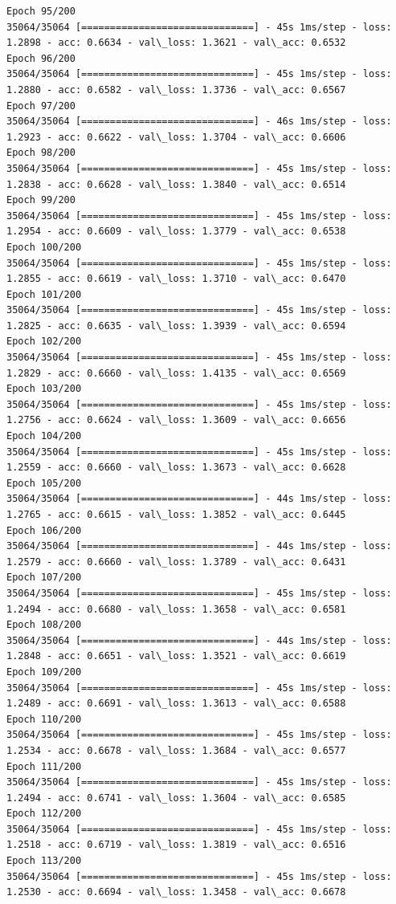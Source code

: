 \documentclass[11pt]{article}
\begin{document}
\begin{Verbatim}[commandchars=\\\{\}]
Epoch 95/200
35064/35064 [==============================] - 45s 1ms/step - loss: 1.2898 - acc: 0.6634 - val\_loss: 1.3621 - val\_acc: 0.6532
Epoch 96/200
35064/35064 [==============================] - 45s 1ms/step - loss: 1.2880 - acc: 0.6582 - val\_loss: 1.3736 - val\_acc: 0.6567
Epoch 97/200
35064/35064 [==============================] - 46s 1ms/step - loss: 1.2923 - acc: 0.6622 - val\_loss: 1.3704 - val\_acc: 0.6606
Epoch 98/200
35064/35064 [==============================] - 45s 1ms/step - loss: 1.2838 - acc: 0.6628 - val\_loss: 1.3840 - val\_acc: 0.6514
Epoch 99/200
35064/35064 [==============================] - 45s 1ms/step - loss: 1.2954 - acc: 0.6609 - val\_loss: 1.3779 - val\_acc: 0.6538
Epoch 100/200
35064/35064 [==============================] - 45s 1ms/step - loss: 1.2855 - acc: 0.6619 - val\_loss: 1.3710 - val\_acc: 0.6470
Epoch 101/200
35064/35064 [==============================] - 45s 1ms/step - loss: 1.2825 - acc: 0.6635 - val\_loss: 1.3939 - val\_acc: 0.6594
Epoch 102/200
35064/35064 [==============================] - 45s 1ms/step - loss: 1.2829 - acc: 0.6660 - val\_loss: 1.4135 - val\_acc: 0.6569
Epoch 103/200
35064/35064 [==============================] - 45s 1ms/step - loss: 1.2756 - acc: 0.6624 - val\_loss: 1.3609 - val\_acc: 0.6656
Epoch 104/200
35064/35064 [==============================] - 45s 1ms/step - loss: 1.2559 - acc: 0.6660 - val\_loss: 1.3673 - val\_acc: 0.6628
Epoch 105/200
35064/35064 [==============================] - 44s 1ms/step - loss: 1.2765 - acc: 0.6615 - val\_loss: 1.3852 - val\_acc: 0.6445
Epoch 106/200
35064/35064 [==============================] - 44s 1ms/step - loss: 1.2579 - acc: 0.6660 - val\_loss: 1.3789 - val\_acc: 0.6431
Epoch 107/200
35064/35064 [==============================] - 45s 1ms/step - loss: 1.2494 - acc: 0.6680 - val\_loss: 1.3658 - val\_acc: 0.6581
Epoch 108/200
35064/35064 [==============================] - 44s 1ms/step - loss: 1.2848 - acc: 0.6651 - val\_loss: 1.3521 - val\_acc: 0.6619
Epoch 109/200
35064/35064 [==============================] - 45s 1ms/step - loss: 1.2489 - acc: 0.6691 - val\_loss: 1.3613 - val\_acc: 0.6588
Epoch 110/200
35064/35064 [==============================] - 45s 1ms/step - loss: 1.2534 - acc: 0.6678 - val\_loss: 1.3684 - val\_acc: 0.6577
Epoch 111/200
35064/35064 [==============================] - 45s 1ms/step - loss: 1.2494 - acc: 0.6741 - val\_loss: 1.3604 - val\_acc: 0.6585
Epoch 112/200
35064/35064 [==============================] - 45s 1ms/step - loss: 1.2518 - acc: 0.6719 - val\_loss: 1.3819 - val\_acc: 0.6516
Epoch 113/200
35064/35064 [==============================] - 45s 1ms/step - loss: 1.2530 - acc: 0.6694 - val\_loss: 1.3458 - val\_acc: 0.6678

\end{Verbatim}
\end{document}
